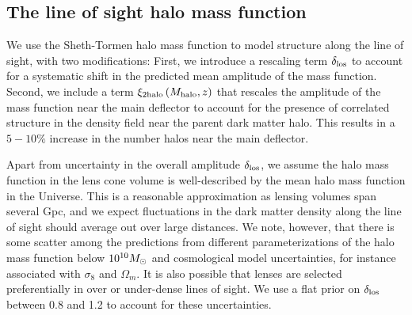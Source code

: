 \subsection{The line of sight halo mass function}
\label{ssec:losassumptions}
We use the Sheth-Tormen \cite{ST99} halo mass function to model structure along the line of sight, with two modifications: First, we introduce a rescaling term $\delta_{\rm{los}}$ to account for a systematic shift in the predicted mean amplitude of the mass function. Second, we include a term $\xi_{\rm{2halo}} \left(M_{\rm{halo}}, z\right)$ that rescales the amplitude of the mass function near the main deflector to account for the presence of correlated structure in the density field near the parent dark matter halo. This results in a $5 - 10 \%$ increase in the number halos near the main deflector. 

Apart from uncertainty in the overall amplitude $\delta_{\rm{los}}$, we assume the halo mass function in the lens cone volume is well-described by the mean halo mass function in the Universe. This is a reasonable approximation as lensing volumes span several Gpc, and we expect fluctuations in the dark matter density along the line of sight should average out over large distances. We note, however, that there is some scatter among the predictions from different parameterizations of the halo mass function below $10^{10}{M_{\odot}}$ \cite[e.g.][]{Despali++16} and cosmological model uncertainties, for instance associated with $\sigma_8$ and $\Omega_m$. It is also possible that lenses are selected preferentially in over or under-dense lines of sight. We use a flat prior on $\delta_{\rm{los}}$ between 0.8 and 1.2 to account for these uncertainties.

